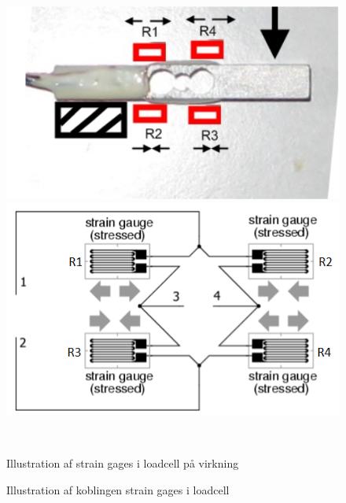 \begin{figure}[htbp] \centering
\begin{minipage}[b]{0.48\textwidth} \centering
\includegraphics[width=1.00\textwidth]{billeder/Hardware/loadcell1.PNG} %
\end{minipage} \hfill
\begin{minipage}[b]{0.48\textwidth} \centering
\includegraphics[width=1.00\textwidth]{billeder/Hardware/straingages2.PNG} %
\end{minipage} \\ %
\begin{minipage}[t]{0.48\textwidth}
\caption{Illustration af strain gages i loadcell på virkning} %
\label{fig:Loadcell1}
\end{minipage} \hfill
\begin{minipage}[t]{0.48\textwidth}
\caption{Illustration af koblingen strain gages i loadcell} %
\label{fig:loadcell2}
\end{minipage}
\end{figure}

